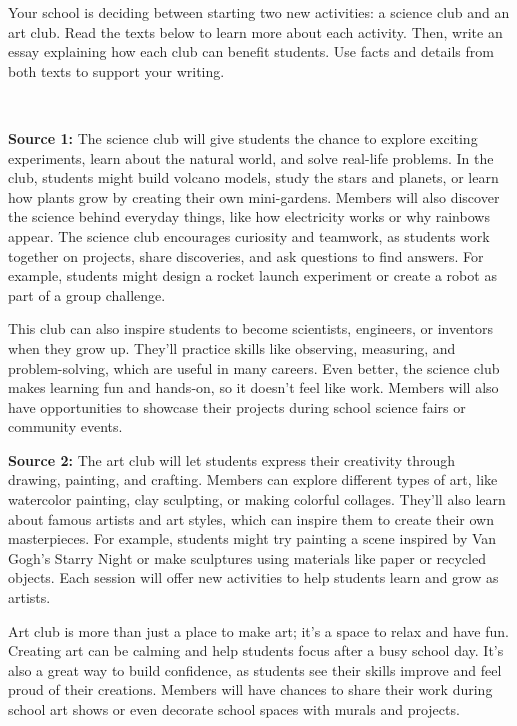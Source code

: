 \documentclass[12pt]{article}
\begin{document}
\begin{tcolorbox}[colframe=black!60, colback=white, 
coltitle=black, colbacktitle=black!15, fonttitle=\bfseries\Large, 
title=Independent Practice, halign title=center, left=10pt, right=10pt, top=10pt, bottom=15pt]
Your school is deciding between starting two new activities: a science club and an art club. Read the texts below to learn more about each activity. Then, write an essay explaining how each club can benefit students. Use facts and details from both texts to support your writing. 



\

\vspace{1em}


\textbf{Source 1:} The science club will give students the chance to explore exciting experiments, learn about the natural world, and solve real-life problems. In the club, students might build volcano models, study the stars and planets, or learn how plants grow by creating their own mini-gardens. Members will also discover the science behind everyday things, like how electricity works or why rainbows appear. The science club encourages curiosity and teamwork, as students work together on projects, share discoveries, and ask questions to find answers. For example, students might design a rocket launch experiment or create a robot as part of a group challenge.

This club can also inspire students to become scientists, engineers, or inventors when they grow up. They’ll practice skills like observing, measuring, and problem-solving, which are useful in many careers. Even better, the science club makes learning fun and hands-on, so it doesn’t feel like work. Members will also have opportunities to showcase their projects during school science fairs or community events. 
 


\vspace{1em}

\textbf{Source 2:} The art club will let students express their creativity through drawing, painting, and crafting. Members can explore different types of art, like watercolor painting, clay sculpting, or making colorful collages. They’ll also learn about famous artists and art styles, which can inspire them to create their own masterpieces. For example, students might try painting a scene inspired by Van Gogh’s Starry Night or make sculptures using materials like paper or recycled objects. Each session will offer new activities to help students learn and grow as artists.

Art club is more than just a place to make art; it’s a space to relax and have fun. Creating art can be calming and help students focus after a busy school day. It’s also a great way to build confidence, as students see their skills improve and feel proud of their creations. Members will have chances to share their work during school art shows or even decorate school spaces with murals and projects.






 


\end{tcolorbox}
\end{document}
